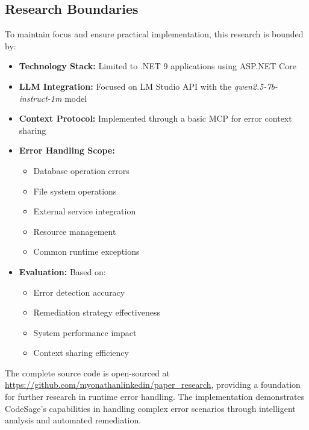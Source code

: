\subsection{Research Boundaries}
To maintain focus and ensure practical implementation, this research is bounded by:

\begin{itemize}
    \item \textbf{Technology Stack:} Limited to .NET 9 applications using ASP.NET Core
    \item \textbf{LLM Integration:} Focused on LM Studio API with the \textit{qwen2.5-7b-instruct-1m} model
    \item \textbf{Context Protocol:} Implemented through a basic MCP for error context sharing
    \item \textbf{Error Handling Scope:}
    \begin{itemize}
        \item Database operation errors
        \item File system operations
        \item External service integration
        \item Resource management
        \item Common runtime exceptions
    \end{itemize}
    \item \textbf{Evaluation:} Based on:
    \begin{itemize}
        \item Error detection accuracy
        \item Remediation strategy effectiveness
        \item System performance impact
        \item Context sharing efficiency
    \end{itemize}
\end{itemize}

The complete source code is open-sourced at \url{https://github.com/myonathanlinkedin/paper_research}, providing a foundation for further research in runtime error handling. The implementation demonstrates CodeSage's capabilities in handling complex error scenarios through intelligent analysis and automated remediation. 